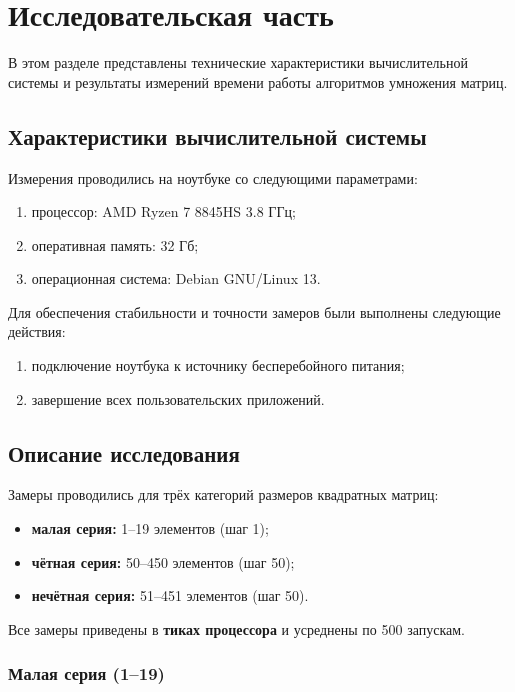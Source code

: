 \chapter{Исследовательская часть}

В этом разделе представлены технические характеристики вычислительной системы и результаты измерений времени работы алгоритмов умножения матриц.

\section{Характеристики вычислительной системы}

Измерения проводились на ноутбуке со следующими параметрами:
\begin{enumerate}
	\item процессор:  AMD Ryzen 7 8845HS 3.8 ГГц;
	\item оперативная память: 32 Гб;
	\item операционная система: Debian GNU/Linux 13.
\end{enumerate}

Для обеспечения стабильности и точности замеров были выполнены следующие действия:
\begin{enumerate}
	\item подключение ноутбука к источнику бесперебойного питания;
	\item завершение всех пользовательских приложений.
\end{enumerate}

\section{Описание исследования}

Замеры проводились для трёх категорий размеров квадратных матриц:

\begin{itemize}
	\item \textbf{малая серия:} 1–19 элементов (шаг 1);
	\item \textbf{чётная серия:} 50–450 элементов (шаг 50);
	\item \textbf{нечётная серия:} 51–451 элементов (шаг 50).
\end{itemize}

Все замеры приведены в \textbf{тиках процессора} и усреднены по 500 запускам.

\subsection{Малая серия (1–19)}

